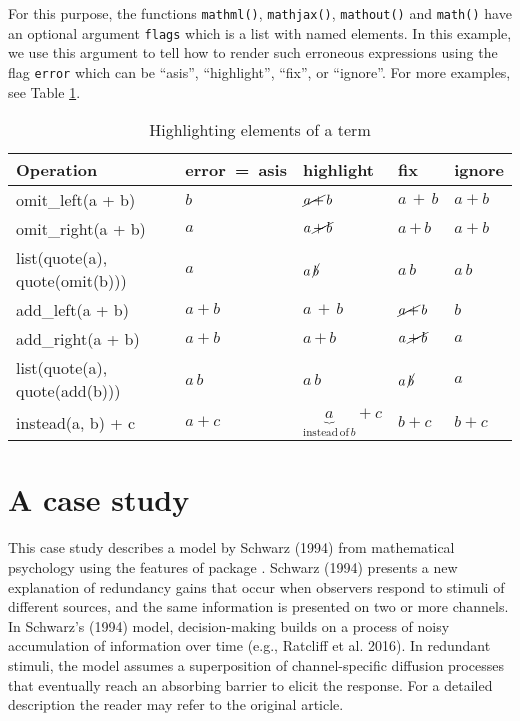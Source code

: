 For this purpose, the functions \texttt{mathml()}, \texttt{mathjax()}, \texttt{mathout()}
and \texttt{math()} have an optional argument \texttt{flags} which is a list with named
elements. In this example, we use this argument to tell  how to
render such erroneous expressions using the flag \texttt{error} which can be ``asis'',
``highlight'', ``fix'', or ``ignore''. For more examples,
see Table \ref{tab:mistakes}.

\begin{table}

\caption{\label{tab:mistakes}Highlighting elements of a term}
\centering
\begin{tabular}[t]{l|l|l|l|l}
\hline
Operation & error\ =\ asis & highlight & fix & ignore\\
\hline
omit\_left(a + b) & $b$ & ${\cancel{{a}{{\,}{+}}}}{{\,}{b}}$ & ${\boxed{{a}{{\,}{+}}}}{{\,}{b}}$ & ${a}{+}{b}$\\
\hline
omit\_right(a + b) & $a$ & ${a}{{\,}{\cancel{{+}{{\,}{b}}}}}$ & ${a}{{\,}{\boxed{{+}{{\,}{b}}}}}$ & ${a}{+}{b}$\\
\hline
list(quote(a), quote(omit(b))) & ${a}{{\,}{\mathrm{}}}$ & ${a}{{\,}{\cancel{b}}}$ & ${a}{{\,}{\boxed{b}}}$ & ${a}{{\,}{b}}$\\
\hline
add\_left(a + b) & ${a}{+}{b}$ & ${\boxed{{a}{{\,}{+}}}}{{\,}{b}}$ & ${\cancel{{a}{{\,}{+}}}}{{\,}{b}}$ & $b$\\
\hline
add\_right(a + b) & ${a}{+}{b}$ & ${a}{{\,}{\boxed{{+}{{\,}{b}}}}}$ & ${a}{{\,}{\cancel{{+}{{\,}{b}}}}}$ & $a$\\
\hline
list(quote(a), quote(add(b))) & ${a}{{\,}{b}}$ & ${a}{{\,}{\boxed{b}}}$ & ${a}{{\,}{\cancel{b}}}$ & ${a}{{\,}{\mathrm{}}}$\\
\hline
instead(a, b) + c & ${a}{+}{c}$ & ${\underbrace{a}_{{\mathrm{instead}}{{\,}{\mathrm{of}}{{\,}{b}}}}}{+}{c}$ & ${\boxed{b}}{+}{c}$ & ${b}{+}{c}$\\
\hline
\end{tabular}
\end{table}

\hypertarget{a-case-study}{%
\section{A case study}\label{a-case-study}}

This case study describes a model by Schwarz (1994) from mathematical
psychology using the features of package . Schwarz (1994)
presents a new explanation of redundancy gains that occur when observers respond
to stimuli of different sources, and the same information is presented on two or
more channels. In Schwarz's (1994) model, decision-making builds on a
process of noisy accumulation of information over time (e.g., Ratcliff et al. 2016). In
redundant stimuli, the model assumes a superposition of channel-specific
diffusion processes that eventually reach an absorbing barrier to elicit the
response. For a detailed description the reader may refer to the original
article.

